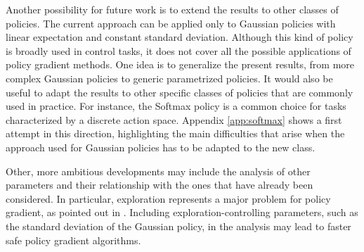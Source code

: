 Another possibility for future work is to extend the results to other classes of policies. The current approach can be applied only to Gaussian policies with linear expectation and constant standard deviation. Although this kind of policy is broadly used in control tasks, it does not cover all the possible applications of policy gradient methods. 
One idea is to generalize the present results, from more complex Gaussian policies to generic parametrized policies.
It would also be useful to adapt the results to other specific classes of policies that are commonly used in practice. For instance, the Softmax policy is a common choice for tasks characterized by a discrete action space. Appendix \ref{app:softmax} shows a first attempt in this direction, highlighting the main difficulties that arise when the approach used for Gaussian policies has to be adapted to the new class.

Other, more ambitious developments may include the analysis of other parameters and their relationship with the ones that have already been considered.
In particular, exploration represents a major problem for policy gradient, as pointed out in \cite{kakade2002approximately}. Including exploration-controlling parameters, such as the standard deviation of the Gaussian policy, in the analysis may lead to faster safe policy gradient algorithms.